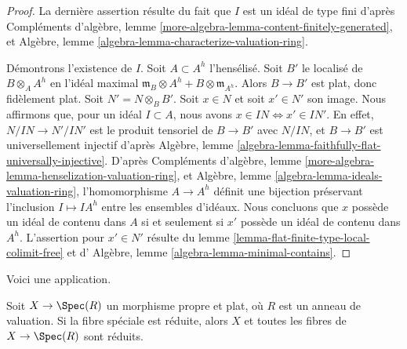 \begin{proof}
La dernière assertion résulte du fait que $I$ est un idéal de type
fini d'après
Compléments d'algèbre, lemme \ref{more-algebra-lemma-content-finitely-generated},
et Algèbre, lemme \ref{algebra-lemma-characterize-valuation-ring}.

\medskip\noindent
Démontrons l'existence de $I$.
Soit $A \subset A^h$ l'hensélisé. Soit $B'$ le localisé
de $B \otimes_A A^h$ en l'idéal maximal
$\mathfrak m_B \otimes A^h + B \otimes \mathfrak m_{A^h}$.
Alors $B \to B'$ est plat, donc fidèlement plat.
Soit $N' = N \otimes_B B'$.
Soit $x \in N$ et soit $x' \in N'$ son image.
Nous affirmons que, pour un idéal $I \subset A$, nous avons
$x \in IN \Leftrightarrow x' \in IN'$.
En effet, $N/IN \to N'/IN'$ est le produit tensoriel de $B \to B'$
avec $N/IN$, et $B \to B'$ est universellement injectif d'après
Algèbre, lemme \ref{algebra-lemma-faithfully-flat-universally-injective}.
D'après Compléments d'algèbre, lemme \ref{more-algebra-lemma-henselization-valuation-ring},
et Algèbre, lemme \ref{algebra-lemma-ideals-valuation-ring},
l'homomorphisme $A \to A^h$ définit une bijection préservant
l'inclusion $I \mapsto IA^h$ entre les ensembles d'idéaux. Nous concluons que
$x$ possède un idéal de contenu dans $A$ si et seulement si $x'$ possède un idéal de
contenu dans $A^h$. L'assertion pour $x' \in N'$ résulte du
lemme \ref{lemma-flat-finite-type-local-colimit-free} et d'
Algèbre, lemme \ref{algebra-lemma-minimal-contains}.
\end{proof}

\noindent
Voici une application.

\begin{lemma}
\label{lemma-proper-flat-over-dvr-reduced-fibre}
Soit $X \to \Spec(R)$ un morphisme propre et plat, où $R$ est un anneau de valuation.
Si la fibre spéciale est réduite, alors $X$ et toutes les fibres de $X \to \Spec(R)$
sont réduits.
\end{lemma}


